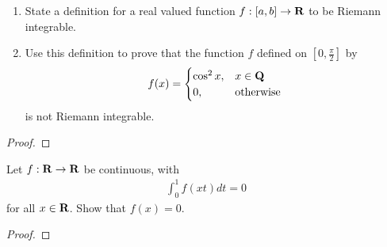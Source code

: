 \documentclass[11pt,twoside,openany]{memoir}
\begin{document}
\newpage
\fancyhead[L]{\scalebox{0.9}{Integration}}
\fancyhead[R]{\scalebox{0.9}{Appeared on: F23}}
\begin{problem}
    \phantom{a}
    \begin{enumerate}[label = (\arabic*)]
        \item State a definition for a real valued function $f:[a,b] \rightarrow \mathbf{R}$ to be Riemann integrable.
        \item Use this definition to prove that the function $f$ defined on $[0, \frac{\pi}{2}]$ by 
            \begin{equation*}
            \begin{split}
                f(x) =
                \begin{cases}
                    \cos ^2 x,& x \in \mathbf{Q} \\
                    0, & \text{otherwise}
                \end{cases}
            \end{split}
            \end{equation*}
        is not Riemann integrable.
    \end{enumerate}
\end{problem}
\begin{proof}
\end{proof}

\newpage
\fancyhead[L]{\scalebox{0.9}{Integration}}
\fancyhead[R]{\scalebox{0.9}{Appeared on: W23}}
\begin{problem}
    Let $f:\mathbf{R} \rightarrow \mathbf{R}$ be continuous, with 
        \begin{equation*}
        \begin{split}
            \int_0^1 f(xt)dt = 0
        \end{split}
        \end{equation*}
    for all $x \in \mathbf{R}$. Show that $f(x) = 0$.
\end{problem}
\begin{proof}
\end{proof}
\end{document}
